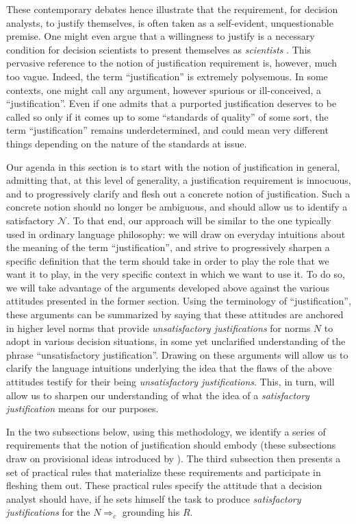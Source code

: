 \documentclass[preprint, french, english, 11pt, authoryear]{elsarticle}%
\newcommand{\adv}{\mathscr{N}}
\begin{document}
These contemporary debates hence illustrate that the requirement, for decision analysts, to justify themselves, is often taken as a self-evident, unquestionable premise. One might even argue that a willingness to justify is a necessary condition for decision scientists to present themselves as \emph{scientists} \citep{ormerod_justifying_2010}. This pervasive reference to the notion of justification requirement is, however, much too vague. Indeed, the term ``justification'' is extremely polysemous. In some contexts, one might call any argument, however spurious or ill-conceived, a ``justification''. Even if one admits that a purported justification deserves to be called so only if it comes up to some ``standards of quality'' of some sort, the term ``justification'' remains underdetermined, and could mean very different things depending on the nature of the standards at issue.

Our agenda in this section is to start with the notion of justification in general, admitting that, at this level of generality, a justification requirement is innocuous, and to progressively clarify and flesh out a concrete notion of justification. Such a concrete notion should no longer be ambiguous, and should allow us to identify a satisfactory $\adv$. To that end, our approach will be similar to the one typically used in ordinary language philosophy: we will draw on everyday intuitions about the meaning of the term ``justification'', and strive to progressively sharpen a specific definition that the term should take in order to play the role that we want it to play, in the very specific context in which we want to use it. To do so, we will take advantage of the arguments developed above against the various attitudes presented in the former section. Using the terminology of ``justification'', these arguments can be summarized by saying that these attitudes are anchored in higher level norms that provide \emph{unsatisfactory justifications} for norms $N$ to adopt in various decision situations, in some yet unclarified understanding of the phrase ``unsatisfactory justification''. Drawing on these arguments will allow us to clarify the language intuitions underlying the idea that the flaws of the above attitudes testify for their being \emph{unsatisfactory justifications}. This, in turn, will allow us to sharpen our understanding of what the idea of a \emph{satisfactory justification} means for our purposes.

In the two subsections below, using this methodology, we identify a series of requirements that the notion of justification should embody (these subsections draw on provisional ideas introduced by \citet{meinard_du_2013, meinard_what_2017}). The third subsection then presents a set of practical rules that materialize these requirements and participate in fleshing them out. These practical rules specify the attitude that a decision analyst should have, if he sets himself the task to produce \emph{satisfactory justifications} for the $N⇒_c$ grounding his $R$.
\end{document}

